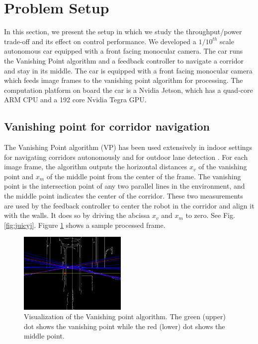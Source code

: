 \section{Problem Setup}
\label{sec:problemSetup}
In this section, we present the setup in which we study the throughput/power trade-off and its effect on control performance. 
We developed a $1/10^{th}$ scale autonomous car equipped with a front facing monocular camera.
The car runs the Vanishing Point algorithm \cite{VP1,VP2} and a feedback controller to navigate a corridor and stay in its middle.
The car is equipped with a front facing monocular camera which feeds image frames to the vanishing point algorithm for processing.
The computation platform on board the car is a Nvidia Jetson, which has a quad-core ARM CPU and a 192 core Nvidia Tegra GPU.


\subsection{Vanishing point for corridor navigation}

The Vanishing Point algorithm (VP) \cite{VP1} has been used extensively in indoor settings for navigating corridors autonomously \cite{VP2, VP3} and for outdoor lane detection \cite{gallagher2002ground}.
For each image frame, the algorithm outputs the horizontal distances $x_v$ of the vanishing point and $x_m$ of the middle point from the center of the frame. 
The vanishing point is the intersection point of any two parallel lines in the environment, and the middle point indicates the center of the corridor. 
These two measurements are used by the feedback controller to center the robot in the corridor and align it with the walls. 
It does so by driving the abcissa $x_v$ and $x_m$ to zero. 
See Fig. \ref{fig:juicyj}.
Figure \ref{fig:vp_viz} shows a sample processed frame.

\begin{figure}[t]
\centering
\includegraphics[width=0.46\textwidth]{Figs/vpmpimages/image_23_-30_-51.png}
\caption{Visualization of the Vanishing point algorithm. The green (upper) dot shows the vanishing point while the red (lower) dot shows the middle point.}
\label{fig:vp_viz} %
\end{figure}


